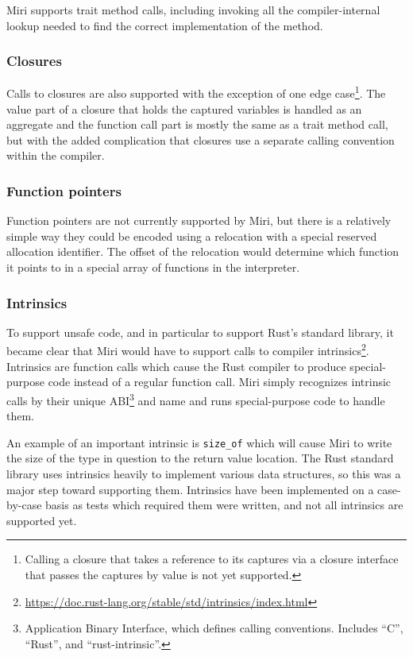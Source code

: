 \documentclass[twocolumn]{article}
\newcommand{\rust}[1]{\texttt{#1}}
\begin{document}
Miri supports trait method calls, including invoking all the compiler-internal lookup needed to find
the correct implementation of the method.

\subsubsection{Closures}

Calls to closures are also supported with the exception of one edge case\footnote{Calling a closure
that takes a reference to its captures via a closure interface that passes the captures by value is
not yet supported.}. The value part of a closure that holds the captured variables is handled as an
aggregate and the function call part is mostly the same as a trait method call, but with the added
complication that closures use a separate calling convention within the compiler.

\subsubsection{Function pointers}

Function pointers are not currently supported by Miri, but there is a relatively simple way they
could be encoded using a relocation with a special reserved allocation identifier. The offset of the
relocation would determine which function it points to in a special array of functions in the
interpreter.

\subsubsection{Intrinsics}

To support unsafe code, and in particular to support Rust's standard library, it became clear that
Miri would have to support calls to compiler
intrinsics\footnote{\url{https://doc.rust-lang.org/stable/std/intrinsics/index.html}}. Intrinsics
are function calls which cause the Rust compiler to produce special-purpose code instead of a
regular function call. Miri simply recognizes intrinsic calls by their unique
ABI\footnote{Application Binary Interface, which defines calling conventions. Includes ``C'',
``Rust'', and ``rust-intrinsic''.} and name and runs special-purpose code to handle them.

An example of an important intrinsic is \rust{size_of} which will cause Miri to write the size of
the type in question to the return value location. The Rust standard library uses intrinsics heavily
to implement various data structures, so this was a major step toward supporting them. Intrinsics
have been implemented on a case-by-case basis as tests which required them were written, and not all
intrinsics are supported yet.
\end{document}

